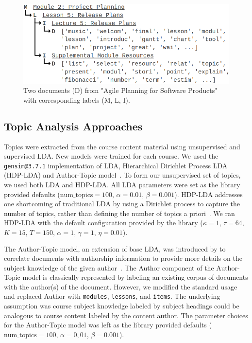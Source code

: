 \documentclass[sigconf, anonymous]{acmart}
\begin{document}
\begin{figure}
    \centering
    \includegraphics[width=\columnwidth]{fig/sample_doc}
    \caption{Two documents (D) from "Agile Planning for Software Products" with corresponding labels (M, L, I).}
    \label{fig:sample_doc}
\end{figure}

\subsection{Topic Analysis Approaches}
Topics were extracted from the course content material using unsupervised and supervised LDA.
New models were trained for each course.
We used the \texttt{gensim@3.7.1} implementation of LDA, Hierarchical Dirichlet Process LDA (HDP-LDA) and Author-Topic model~\cite{rehurek_lrec}.
To form our unsupervised set of topics, we used both LDA and HDP-LDA.
All LDA parameters were set as the library provided defaults ($\text{num\_topics}=100$, $\alpha=0.01$, $\beta=0.001$).
HDP-LDA addresses one shortcoming of traditional LDA by using a Dirichlet process to capture the number of topics, rather than defining the number of topics a priori~\cite{wang2011online}.
We ran HDP-LDA with the default configuration provided by the library ($\kappa=1$, $\tau=64$, $K=15$, $T=150$, $\alpha=1$, $\gamma=1$, $\eta=0.01$).

The Author-Topic model, an extension of base LDA, was introduced by \citeauthor{rosen2004author} to correlate documents with authorship information to provide more details on the subject knowledge of the given author~\cite{rosen2004author}.
The Author component of the Author-Topic model is classically represented by labeling an existing corpus of documents with the author(s) of the document.
However, we modified the standard usage and replaced Author with \texttt{modules}, \texttt{lessons}, and \texttt{items}.
The underlying assumption was course subject knowledge labeled by subject headings could be analogous to course content labeled by the content author.
The parameter choices for the Author-Topic model was left as the library provided defaults ($\text{num\_topics}=100$, $\alpha=0,01$, $\beta=0.001$).
\end{document}
